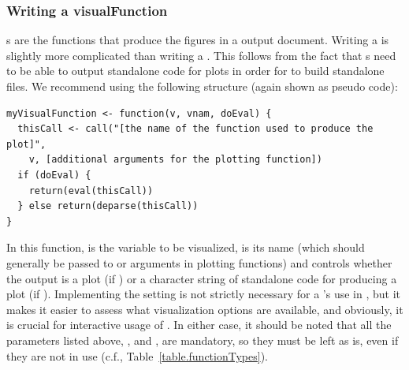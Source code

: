 \documentclass[article,shortnames]{jss}
\begin{document}




\subsubsection{Writing a visualFunction}
s are the functions that produce the figures in a
 output document. Writing a  is slightly
more complicated than writing a . This follows from
the fact that s need to be able to output standalone
code for plots in order for  to build standalone
 files. We recommend using the following structure
(again shown as pseudo code):
\begin{Verbatim}
myVisualFunction <- function(v, vnam, doEval) {
  thisCall <- call("[the name of the function used to produce the plot]",
    v, [additional arguments for the plotting function])
  if (doEval) {
    return(eval(thisCall))
  } else return(deparse(thisCall))
}
\end{Verbatim}

In this function,  is the variable to be visualized,
 is its name (which should generally be passed to
 or  arguments in plotting functions) and
 controls whether the output is a plot (if )
or a character string of standalone code for producing a plot (if
). Implementing the  setting is not
strictly necessary for a 's use in , but
it makes it easier to assess what visualization options are available,
and obviously, it is crucial for interactive usage of
. In either case, it should be noted that all
the parameters listed above, ,  and ,
are mandatory, so they must be left as is, even if they are not in
use (c.f., Table~\ref{table.functionTypes}).
\end{document}

